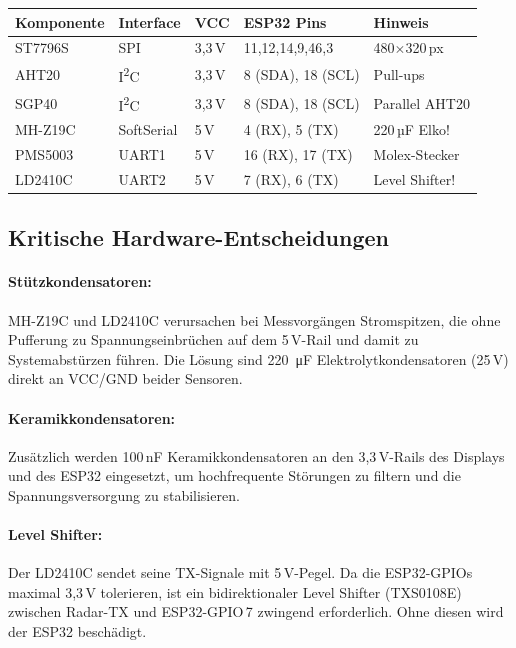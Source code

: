 \begin{table}[htb]
\centering
\renewcommand{\arraystretch}{1.3}
\label{tab:interfaces}
\begin{tabular}{p{2.5cm} p{2cm} p{1.5cm} p{3cm} p{2.5cm}}
\toprule
\rowcolor{tableheader}
\textbf{Komponente} & \textbf{Interface} & \textbf{VCC} & \textbf{ESP32 Pins} & \textbf{Hinweis} \\
\midrule
ST7796S & SPI & 3,3\,V & 11,12,14,9,46,3 & 480$\times$320\,px \\
AHT20 & I\textsuperscript{2}C & 3,3\,V & 8 (SDA), 18 (SCL) & Pull-ups \\
SGP40 & I\textsuperscript{2}C & 3,3\,V & 8 (SDA), 18 (SCL) & Parallel AHT20 \\
MH-Z19C & SoftSerial & 5\,V & 4 (RX), 5 (TX) & 220\,µF Elko! \\
PMS5003 & UART1 & 5\,V & 16 (RX), 17 (TX) & Molex-Stecker \\
LD2410C & UART2 & 5\,V & 7 (RX), 6 (TX) & Level Shifter! \\
\bottomrule
\end{tabular}
\end{table}

\subsection{Kritische Hardware-Entscheidungen}
\label{sec:hw_decisions}

\paragraph{Stützkondensatoren:} MH-Z19C und LD2410C verursachen bei Messvorgängen Stromspitzen, die ohne Pufferung zu Spannungseinbrüchen auf dem 5\,V-Rail und damit zu Systemabstürzen führen. Die Lösung sind \SI{220}{\micro\farad} Elektrolytkondensatoren (25\,V) direkt an VCC/GND beider Sensoren.

\paragraph{Keramikkondensatoren:} Zusätzlich werden 100\,nF Keramikkondensatoren an den 3,3\,V-Rails des Displays und des ESP32 eingesetzt, um hochfrequente Störungen zu filtern und die Spannungsversorgung zu stabilisieren.

\paragraph{Level Shifter:} Der LD2410C sendet seine TX-Signale mit 5\,V-Pegel. Da die ESP32-GPIOs maximal 3,3\,V tolerieren, ist ein bidirektionaler Level Shifter (TXS0108E) zwischen Radar-TX und ESP32-GPIO\,7 zwingend erforderlich. Ohne diesen wird der ESP32 beschädigt.

